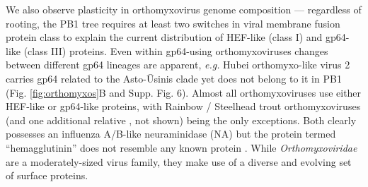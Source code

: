 \documentclass[11pt,twocolumn]{article}
\begin{document}
We also observe plasticity in orthomyxovirus genome composition --- regardless of rooting, the PB1 tree requires at least two switches in viral membrane fusion protein class to explain the current distribution of HEF-like (class I) and gp64-like (class III) proteins.
Even within gp64-using orthomyxoviruses changes between different gp64 lineages are apparent, \textit{e.g.} Hubei orthomyxo-like virus 2 carries gp64 related to the Asto-\={U}sinis clade yet does not belong to it in PB1 (Fig. \ref{fig:orthomyxos}B and Supp. Fig. 6).
Almost all orthomyxoviruses use either HEF-like or gp64-like proteins, with Rainbow / Steelhead trout orthomyxoviruses (and one additional relative \citep{batts_molecular_2017}, not shown) being the only exceptions. Both clearly possesses an influenza A/B-like neuraminidase (NA) but the protein termed ``hemagglutinin'' \citep{batts_molecular_2017} does not resemble any known protein \citep{finn_hmmer_2011}.
While \textit{Orthomyxoviridae} are a moderately-sized virus family, they make use of a diverse and evolving set of surface proteins.
\end{document}
